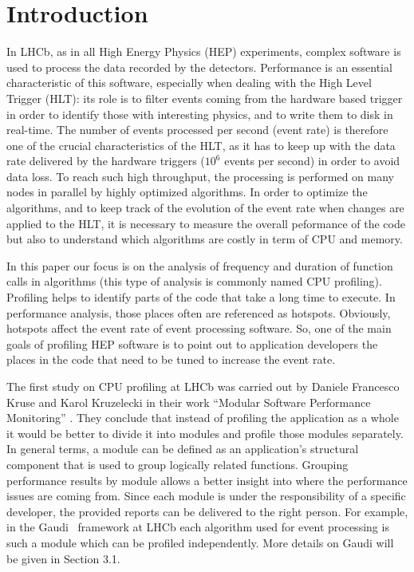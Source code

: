 \documentclass[a4paper]{jpconf}
\begin{document}
\section{Introduction}
In LHCb, as in all High Energy Physics (HEP) experiments, complex software is used to process the data recorded 
by the detectors. Performance is an essential characteristic of this software, especially when dealing with 
the High Level Trigger (HLT): its role is to filter events coming from the hardware based trigger in order to identify 
those with interesting physics, and to write them to disk in real-time. The number of events processed per 
second (event rate) is therefore one of the crucial characteristics of the HLT, as it has to keep up with the data rate 
delivered by the hardware triggers ($10^6$ events per second) in order to avoid data loss. To reach such high 
throughput, the processing is performed on many nodes in parallel by highly optimized algorithms. In order to optimize 
the algorithms, and to keep track of the evolution of the event rate when changes are applied to the HLT, it is 
necessary to measure the overall peformance of the code but also to understand which algorithms are costly in term of 
CPU and memory.

In this paper our focus is on the analysis of frequency and duration of function calls in algorithms (this type of 
analysis is commonly named CPU profiling). Profiling helps to identify parts of the code that take a long time to 
execute. In performance analysis, those places often are referenced as hotspots. Obviously,  hotspots affect the event 
rate of event processing software. So, one of the main goals of profiling HEP software is to point out to application 
developers the places in the code that need to be tuned to increase the event rate.

The first study on CPU profiling at LHCb was carried out by Daniele Francesco Kruse and Karol Kruzelecki in their work 
“Modular Software Performance Monitoring” \cite{modular}. They conclude that instead of profiling 
the application as a whole it would be better to divide it into modules and profile those modules separately. 
In general terms, a module can be defined as an application’s structural component that is used to group logically 
related functions.  Grouping performance results by module allows a better insight into where the performance 
issues are coming from. Since each module is under the responsibility of a specific developer, the provided reports 
can be delivered to the right person. For example, in the Gaudi~\cite{gaudi} 
framework at LHCb each algorithm used for event processing is such a module which can be profiled independently. 
More details on Gaudi will be given in Section 3.1. 
\end{document}
